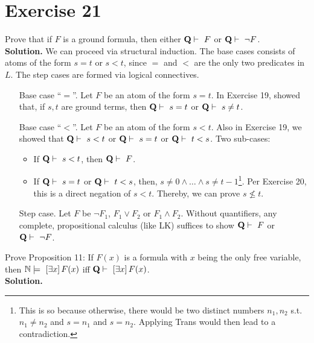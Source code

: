 \section{Exercise 21}

Prove that if $F$ is a ground formula, then either $\mathbf{Q} \vdash\ F$ or $\mathbf{Q} \vdash\ \neg F$.\\

\noindent
\textbf{Solution.} We can proceed via structural induction. The base cases consists of atoms of the form $s = t$ or $s < t$, since $=$ and $<$ are the only two predicates in $L$. The step cases are formed via logical connectives.\\

\begin{itemize}
	\item[Base case ``$=$''.] Let $F$ be an atom of the form $s = t$. In Exercise 19, showed that, if $s,t$ are ground terms, then $\mathbf{Q} \vdash\ s = t$ or $\mathbf{Q} \vdash\ s \neq t$.
	
	\item[Base case ``$<$''.] Let $F$ be an atom of the form $s < t$. Also in Exercise 19, we showed that $\mathbf{Q} \vdash\ s < t$ or $\mathbf{Q} \vdash\ s = t$ or $\mathbf{Q} \vdash\ t < s$. Two sub-cases: 
	
	\begin{itemize}
		\item If $\mathbf{Q} \vdash\ s < t$, then $\mathbf{Q} \vdash\ F$.
		\item If $\mathbf{Q} \vdash\ s = t$ or $\mathbf{Q} \vdash\ t < s$, then, $s \neq 0 \wedge \dots \wedge s \neq t-1$\footnote{This is so because otherwise, there would be two distinct numbers $n_1,n_2$ s.t. $n_1 \neq n_2$ and $s = n_1$ and $s = n_2$. Applying Trans would then lead to a contradiction.}. Per Exercise 20, this is a direct negation of $s < t$. Thereby, we can prove $s \nleq t$.
	\end{itemize}
	
	\item[Step case.] Let $F$ be $\neg F_1$, $F_1 \vee F_2$ or $F_1 \wedge F_2$.  Without quantifiers, any complete, propositional calculus (like LK) suffices to show $\mathbf{Q} \vdash\ F$ or $\mathbf{Q} \vdash\ \neg F$. 
\end{itemize}

\noindent
Prove Proposition 11: If $F(x)$ is a formula with $x$ being the only free variable, then $\mathbb{N} \models\ \left[ \exists x \right] F(x)$ iff $\mathbf{Q} \vdash\ \left[ \exists x \right] F(x)$.\\

\noindent
\textbf{Solution.}

